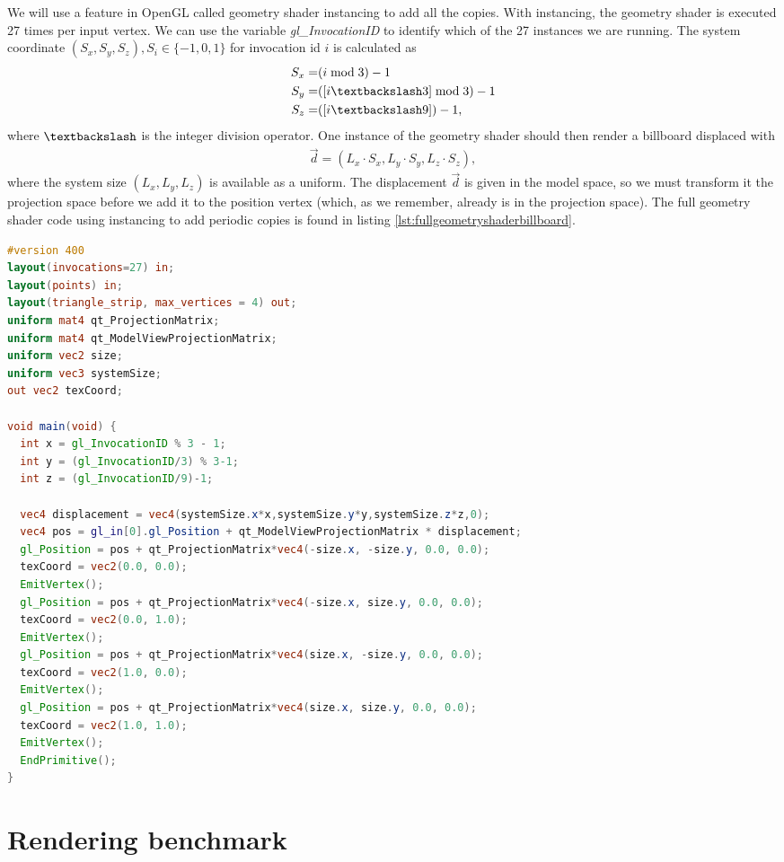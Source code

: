 We will use a feature in OpenGL called geometry shader instancing to add all the copies. With instancing, the geometry shader is executed 27 times per input vertex. We can use the variable \textit{gl\_InvocationID} to identify which of the 27 instances we are running. The system coordinate $(S_x, S_y, S_z), S_i \in \{-1, 0, 1\}$ for invocation id $i$ is calculated as
\begin{align}
	S_x =& (i\bmod 3) - 1\\
	S_y =& ([i\textbackslash3]\bmod 3) - 1\\
	S_z =& ([i\textbackslash9]) - 1,
\end{align}
where $\textbackslash$ is the integer division operator. One instance of the geometry shader should then render a billboard displaced with 
\begin{align}
	\vec d = (L_x\cdot S_x, L_y\cdot S_y, L_z\cdot S_z),
\end{align}
where the system size $(L_x, L_y, L_z)$ is available as a uniform. The displacement $\vec d$ is given in the model space, so we must transform it the projection space before we add it to the position vertex (which, as we remember, already is in the projection space). The full geometry shader code using instancing to add periodic copies is found in listing \ref{lst:fullgeometryshaderbillboard}.
\begin{lstlisting}[caption=billboardGeometryShaderWithPeriodicCopies.glsl, label=lst:fullgeometryshaderbillboard, language=GLSL]
#version 400
layout(invocations=27) in;
layout(points) in;
layout(triangle_strip, max_vertices = 4) out;
uniform mat4 qt_ProjectionMatrix;
uniform mat4 qt_ModelViewProjectionMatrix;
uniform vec2 size;
uniform vec3 systemSize;
out vec2 texCoord;

void main(void) {
  int x = gl_InvocationID % 3 - 1;
  int y = (gl_InvocationID/3) % 3-1;
  int z = (gl_InvocationID/9)-1;
    
  vec4 displacement = vec4(systemSize.x*x,systemSize.y*y,systemSize.z*z,0);
  vec4 pos = gl_in[0].gl_Position + qt_ModelViewProjectionMatrix * displacement;
  gl_Position = pos + qt_ProjectionMatrix*vec4(-size.x, -size.y, 0.0, 0.0);
  texCoord = vec2(0.0, 0.0);
  EmitVertex();
  gl_Position = pos + qt_ProjectionMatrix*vec4(-size.x, size.y, 0.0, 0.0);
  texCoord = vec2(0.0, 1.0);
  EmitVertex();
  gl_Position = pos + qt_ProjectionMatrix*vec4(size.x, -size.y, 0.0, 0.0);
  texCoord = vec2(1.0, 0.0);
  EmitVertex();
  gl_Position = pos + qt_ProjectionMatrix*vec4(size.x, size.y, 0.0, 0.0);
  texCoord = vec2(1.0, 1.0);
  EmitVertex();
  EndPrimitive();
}
\end{lstlisting}
\section{Rendering benchmark}
\label{sec:vis_benchmark}
